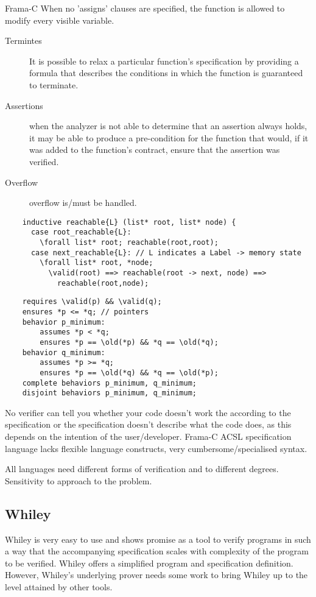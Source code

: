 \documentclass[10pt]{article} %
\begin{document}
Frama-C When no 'assigns' clauses are specified, the function is allowed to modify every visible variable.
\begin{description}
\item[Termintes]It is possible to relax a particular function’s specification by providing a formula that describes the conditions in which the function is guaranteed to terminate. 
\item[Assertions]when the analyzer is not able to determine that an assertion always holds, it may be able to produce a pre-condition for the function that would, if it was added to the function’s contract, ensure that the assertion was verified. 
\item[Overflow] overflow is\slash must be handled.
\end{description}


\begin{lstlisting}
	inductive reachable{L} (list* root, list* node) {
	  case root_reachable{L}:
	    \forall list* root; reachable(root,root);
	  case next_reachable{L}: // L indicates a Label -> memory state
	    \forall list* root, *node;
	      \valid(root) ==> reachable(root -> next, node) ==>
	        reachable(root,node);
\end{lstlisting}
\begin{lstlisting}
	requires \valid(p) && \valid(q);
	ensures *p <= *q; // pointers
	behavior p_minimum:
		assumes *p < *q;
		ensures *p == \old(*p) && *q == \old(*q);
	behavior q_minimum:
		assumes *p >= *q;
		ensures *p == \old(*q) && *q == \old(*p);
	complete behaviors p_minimum, q_minimum;
	disjoint behaviors p_minimum, q_minimum;
\end{lstlisting}

No verifier can tell you whether your code doesn't work the according to the specification or the specification doesn't describe what the code does, as this depends on the intention of the user\slash developer.
Frama-C ACSL specification language lacks flexible language constructs, very cumbersome\slash specialised syntax.

All languages need different forms of verification and to different degrees. Sensitivity to approach to the problem.
\subsection{Whiley}
	Whiley is very easy to use and shows promise as a tool to verify programs in such a way that the accompanying specification scales with complexity of the program to be verified. Whiley offers a simplified program and specification definition. However, Whiley's underlying prover needs some work to bring Whiley up to the level attained by other tools.
\end{document}
